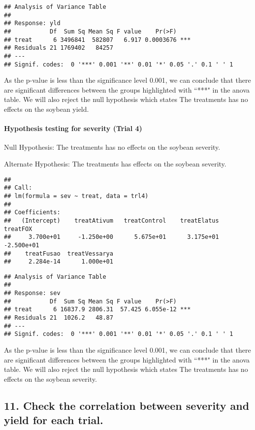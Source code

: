\documentclass[
]{article}
\begin{document}
\begin{verbatim}
## Analysis of Variance Table
## 
## Response: yld
##           Df  Sum Sq Mean Sq F value    Pr(>F)    
## treat      6 3496841  582807   6.917 0.0003676 ***
## Residuals 21 1769402   84257                      
## ---
## Signif. codes:  0 '***' 0.001 '**' 0.01 '*' 0.05 '.' 0.1 ' ' 1
\end{verbatim}

As the p-value is less than the significance level 0.001, we can
conclude that there are significant differences between the groups
highlighted with ``***" in the anova table. We will also reject the null
hypothesis which states The treatments has no effects on the soybean
yield.

\hypertarget{hypothesis-testing-for-severity-trial-4}{%
\paragraph{Hypothesis testing for severity (Trial
4)}\label{hypothesis-testing-for-severity-trial-4}}

Null Hypothesis: The treatments has no effects on the soybean severity.

Alternate Hypothesis: The treatments has effects on the soybean
severity.

\begin{verbatim}
## 
## Call:
## lm(formula = sev ~ treat, data = trl4)
## 
## Coefficients:
##   (Intercept)    treatAtivum   treatControl    treatElatus       treatFOX  
##     3.700e+01     -1.250e+00      5.675e+01      3.175e+01     -2.500e+01  
##    treatFusao  treatVessarya  
##     2.284e-14      1.000e+01
\end{verbatim}

\begin{verbatim}
## Analysis of Variance Table
## 
## Response: sev
##           Df  Sum Sq Mean Sq F value    Pr(>F)    
## treat      6 16837.9 2806.31  57.425 6.055e-12 ***
## Residuals 21  1026.2   48.87                      
## ---
## Signif. codes:  0 '***' 0.001 '**' 0.01 '*' 0.05 '.' 0.1 ' ' 1
\end{verbatim}

As the p-value is less than the significance level 0.001, we can
conclude that there are significant differences between the groups
highlighted with ``***" in the anova table. We will also reject the null
hypothesis which states The treatments has no effects on the soybean
severity.

\hypertarget{check-the-correlation-between-severity-and-yield-for-each-trial.}{%
\subsection{11. Check the correlation between severity and yield for
each
trial.}\label{check-the-correlation-between-severity-and-yield-for-each-trial.}}
\end{document}
